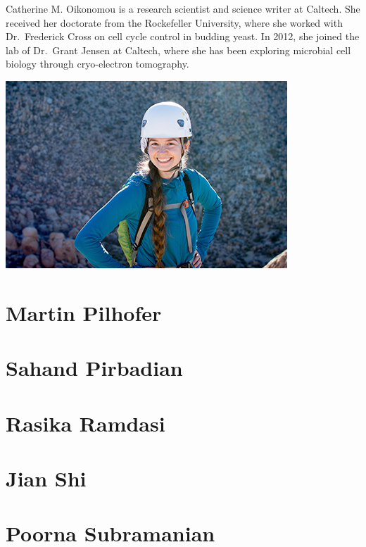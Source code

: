 \documentclass[]{tufte-book}
\begin{document}
Catherine M. Oikonomou is a research scientist and science writer at Caltech. She received her doctorate from the Rockefeller University, where she worked with Dr.~Frederick Cross on cell cycle control in budding yeast. In 2012, she joined the lab of Dr.~Grant Jensen at Caltech, where she has been exploring microbial cell biology through cryo-electron tomography.

\includegraphics{img/bios/catherine_oikonomou}

\hypertarget{martin_pilhofer}{%
\section*{Martin Pilhofer}\label{martin_pilhofer}}

\hypertarget{sahand_pirbadian}{%
\section*{Sahand Pirbadian}\label{sahand_pirbadian}}

\hypertarget{rasika_ramdasi}{%
\section*{Rasika Ramdasi}\label{rasika_ramdasi}}

\hypertarget{jian_shi}{%
\section*{Jian Shi}\label{jian_shi}}

\hypertarget{poorna_subramanian}{%
\section*{Poorna Subramanian}\label{poorna_subramanian}}
\end{document}
